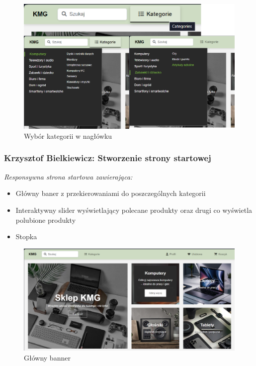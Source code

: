 \documentclass[12pt,a4paper,oneside]{article}
\theoremstyle{definition}
\numberwithin{equation}{section}
\begin{document}
\begin{figure}[H]
    \centering
    \includegraphics[width=0.9\columnwidth]{images/krzysztofBImages/header-categories.png}
    \caption{Wybór kategorii w nagłówku}
    \label{header-categories}
\end{figure}


\subsubsection{Krzysztof Bielkiewicz: Stworzenie strony startowej}
\label{1.3.2}
\textit{Responsywna strona startowa zawierająca:}
    \begin{itemize}
        \item Główny baner z przekierowaniami do poszczególnych kategorii
        \item Interaktywny slider wyświetlający polecane produkty oraz drugi co wyświetla polubione produkty
        \item Stopka
    \end{itemize}

    \begin{figure}[H]
        \centering
        \includegraphics[width=0.8\columnwidth]{images/krzysztofBImages/main-banner.png}
        \caption{Główny banner}
    \end{figure}
\end{document}
